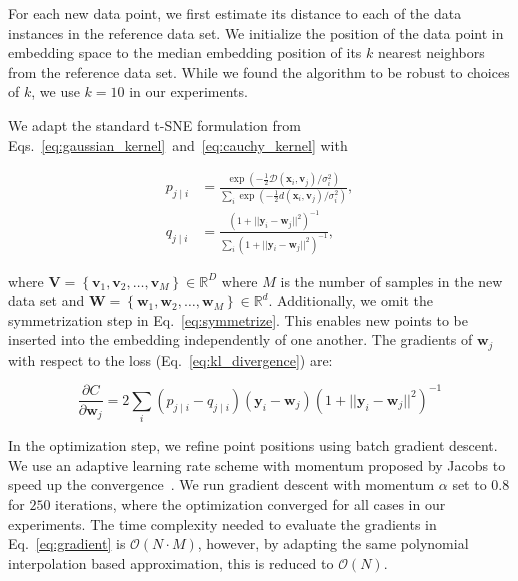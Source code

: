 \documentclass[runningheads]{llncs}
\begin{document}
For each new data point, we first estimate its distance to each of the data instances in the reference data set. We initialize the position of the data point in embedding space to the median embedding position of its $k$ nearest neighbors from the reference data set. While we found the algorithm to be robust to choices of $k$, we use $k=10$ in our experiments.

We adapt the standard t-SNE formulation from Eqs.~\ref{eq:gaussian_kernel}~and~\ref{eq:cauchy_kernel} with

\begin{align}
p_{j \mid i} &= \frac{\exp \left ( -\frac{1}{2} \mathcal{D}(\mathbf{x}_i, \mathbf{v}_j) / \sigma_i^2 \right )}{\sum_{i} \exp \left ( -\frac{1}{2} d(\mathbf{x}_i, \mathbf{v}_j) / \sigma_i^2 \right )}, \\
q_{j \mid i} &= \frac{\left ( 1 + || \mathbf{y}_i - \mathbf{w}_j ||^2 \right )^{-1}}{\sum_{i}\left ( 1 + || \mathbf{y}_i - \mathbf{w}_j ||^2 \right )^{-1}},
\end{align}

\noindent where $\mathbf{V} = \left \{ \mathbf{v}_1, \mathbf{v}_2, \dots, \mathbf{v}_M \right \} \in \mathbb{R}^D$ where $M$ is the number of samples in the new data set and $\mathbf{W} = \left \{ \mathbf{w}_1, \mathbf{w}_2, \dots, \mathbf{w}_M \right \} \in \mathbb{R}^d$. Additionally, we omit the symmetrization step in Eq.~\ref{eq:symmetrize}. This enables new points to be inserted into the embedding independently of one another. The gradients of $\mathbf{w}_j$ with respect to the loss (Eq.~\ref{eq:kl_divergence}) are:

\begin{equation}
\frac{\partial C}{\partial \mathbf{w}_j} = 2 \sum_i \left ( p_{j \mid i} - q_{j \mid i} \right ) \left ( \mathbf{y}_i - \mathbf{w}_j \right ) \left ( 1 + || \mathbf{y}_i - \mathbf{w}_j || ^2 \right )^{-1}
\label{eq:gradient}
\end{equation}

In the optimization step, we refine point positions using batch gradient descent. We use an adaptive learning rate scheme with momentum proposed by Jacobs to speed up the convergence~\cite{momentum}. We run gradient descent with momentum $\alpha$ set to $0.8$ for $250$ iterations, where the optimization converged for all cases in our experiments.  The time complexity needed to evaluate the gradients in Eq.~\ref{eq:gradient} is $\mathcal{O}(N \cdot M)$, however, by adapting the same polynomial interpolation based approximation, this is reduced to $\mathcal{O}(N)$.
\end{document}

